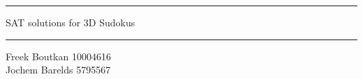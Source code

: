 \documentclass{article}
\begin{document}
	

\begin{center}
\rule{\textwidth}{.4pt}
\Large{SAT solutions for 3D Sudokus\\\vspace{.2cm}}
\rule{\textwidth}{.8pt}

\small{Freek Boutkan 10004616\\Jochem Barelds 5795567}
\end{center}





% 





	






\printbibliography
\end{document}
